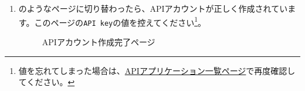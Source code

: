 \begin{enumerate}
            \newpage
            \item {}のようなページに切り替わったら、APIアカウントが正しく作成されています。このページの\texttt{API key}の値を控えてください\footnote{値を忘れてしまった場合は、\href{https://www.last.fm/api/accounts}{APIアプリケーション一覧ページ}で再度確認してください。}。
                \begin{figure}[htbp]
                    \centering
                    \caption{APIアカウント作成完了ページ}
                    \label{img:lastfm4}
                \end{figure}
        \end{enumerate}

    \newpage
